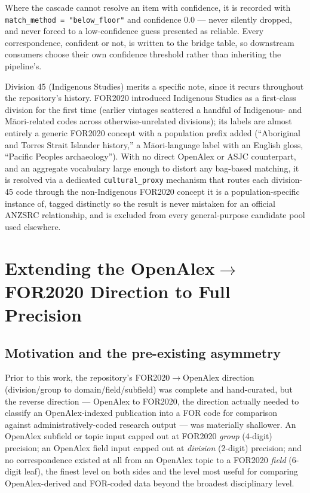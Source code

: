 \documentclass[11pt]{article}
\begin{document}
Where the cascade cannot resolve an item with confidence, it is recorded with
\texttt{match\_method = "below\_floor"} and confidence 0.0 --- never silently dropped, and
never forced to a low-confidence guess presented as reliable. Every correspondence,
confident or not, is written to the bridge table, so downstream consumers choose their
own confidence threshold rather than inheriting the pipeline's.

Division 45 (Indigenous Studies) merits a specific note, since it recurs throughout the
repository's history. FOR2020 introduced Indigenous Studies as a first-class division
for the first time (earlier vintages scattered a handful of Indigenous- and
M\=aori-related codes across otherwise-unrelated divisions); its labels are almost
entirely a generic FOR2020 concept with a population prefix added (``Aboriginal and
Torres Strait Islander history,'' a M\=aori-language label with an English gloss,
``Pacific Peoples archaeology''). With no direct OpenAlex or ASJC counterpart, and an
aggregate vocabulary large enough to distort any bag-based matching, it is
resolved via a dedicated \texttt{cultural\_proxy} mechanism that routes each division-45
code through the non-Indigenous FOR2020 concept it is a population-specific instance of,
tagged distinctly so the result is never mistaken for an official ANZSRC relationship,
and is excluded from every general-purpose candidate pool used elsewhere.

\section{Extending the OpenAlex$\rightarrow$FOR2020 Direction to Full Precision}
\label{sec:extension}

\subsection{Motivation and the pre-existing asymmetry}

Prior to this work, the repository's FOR2020$\rightarrow$OpenAlex direction
(division/group to domain/field/subfield) was complete and hand-curated, but the reverse
direction --- OpenAlex to FOR2020, the direction actually needed to classify an
OpenAlex-indexed publication into a FOR code for comparison against
administratively-coded research output --- was materially shallower. An OpenAlex
subfield or topic input capped out at FOR2020 \emph{group} (4-digit) precision; an
OpenAlex field input capped out at \emph{division} (2-digit) precision; and no
correspondence existed at all from an OpenAlex topic to a FOR2020 \emph{field} (6-digit
leaf), the finest level on both sides and the level most useful for comparing
OpenAlex-derived and FOR-coded data beyond the broadest disciplinary level.
\end{document}
